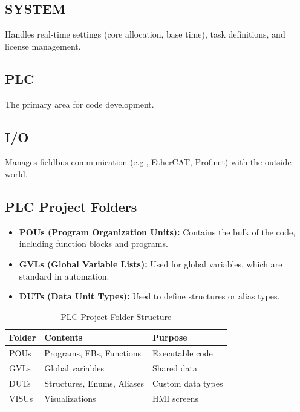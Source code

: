 \documentclass[11pt,a4paper]{article}
\begin{document}
\subsection{SYSTEM}

Handles real-time settings (core allocation, base time), task definitions, and license management.

\subsection{PLC}

The primary area for code development.

\subsection{I/O}

Manages fieldbus communication (e.g., EtherCAT, Profinet) with the outside world.

\subsection{PLC Project Folders}

\begin{itemize}[leftmargin=*]
    \item \textbf{POUs (Program Organization Units):} Contains the bulk of the code, including function blocks and programs.
    \item \textbf{GVLs (Global Variable Lists):} Used for global variables, which are standard in automation.
    \item \textbf{DUTs (Data Unit Types):} Used to define structures or alias types.
\end{itemize}

\begin{table}[h]
\centering
\begin{tabular}{@{}lll@{}}
\toprule
\textbf{Folder} & \textbf{Contents} & \textbf{Purpose} \\
\midrule
POUs & Programs, FBs, Functions & Executable code \\
GVLs & Global variables & Shared data \\
DUTs & Structures, Enums, Aliases & Custom data types \\
VISUs & Visualizations & HMI screens \\
\bottomrule
\end{tabular}
\caption{PLC Project Folder Structure}
\end{table}
\end{document}
